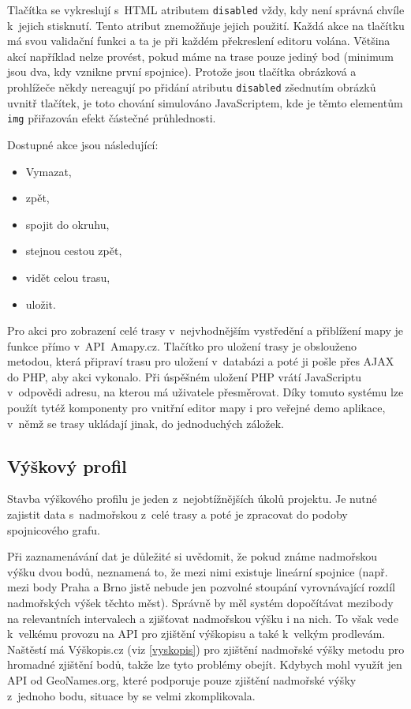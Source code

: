 Tlačítka se vykreslují s~HTML atributem {\tt disabled} vždy,
kdy není správná chvíle k~jejich stisknutí. Tento atribut znemožňuje
jejich použití. Každá akce na tlačítku má svou validační funkci a ta
je při každém překreslení editoru volána. Většina akcí například
nelze provést, pokud máme na trase pouze jediný bod (minimum jsou
dva, kdy vznikne první spojnice). Protože jsou tlačítka obrázková a
prohlížeče někdy nereagují po přidání atributu {\tt disabled}
zšednutím obrázků uvnitř tlačítek, je toto chování simulováno
JavaScriptem, kde je těmto elementům {\tt img} přiřazován efekt
částečné průhlednosti.

Dostupné akce jsou následující:

\begin{itemize}
  \item Vymazat,
  \item zpět,
  \item spojit do okruhu,
  \item stejnou cestou zpět,
  \item vidět celou trasu,
  \item uložit.
\end{itemize}

Pro akci pro zobrazení celé trasy v~nej\-vhodnějším vystředění
a přiblížení mapy je funkce přímo v~API~Amapy.cz. Tlačítko pro
uložení trasy je obslouženo metodou, která připraví trasu pro uložení
v~databázi a poté ji pošle přes AJAX do PHP, aby akci vykonalo. Při
úspěšném uložení PHP vrátí JavaScriptu v~odpovědi adresu, na kterou
má uživatele přesměrovat. Díky tomuto systému lze použít tytéž
komponenty pro vnitřní editor mapy i pro veřejné demo aplikace,
v~němž se trasy ukládají jinak, do jednoduchých záložek.

\subsection{Výškový profil}
Stavba výškového profilu je jeden z~nej\-obtížnějších úkolů projektu.
Je nutné zajistit data s~nadmořskou z~celé trasy a poté je zpracovat
do podoby spojnicového grafu.

Při zaznamenávání dat je důležité si uvědomit, že pokud známe
nadmořskou výšku dvou bodů, neznamená to, že mezi nimi existuje
lineární spojnice (např. mezi body Praha a Brno jistě nebude jen
pozvolné stoupání vyrovnávající rozdíl nadmořských výšek těchto
měst). Správně by měl systém dopočítávat mezibody na relevantních
intervalech a zjišťovat nadmořskou výšku i na nich. To však vede
k~velkému provozu na API pro zjištění výškopisu a také k~velkým
prodlevám. Naštěstí má Výškopis.cz (viz \ref{vyskopis}) pro zjištění
nadmořské výšky metodu pro hromadné zjištění bodů, takže lze tyto
problémy obejít. Kdybych mohl využít jen API od GeoNames.org, které
podporuje pouze zjištění nadmořské výšky z~jednoho bodu, situace by
se velmi zkomplikovala. 

